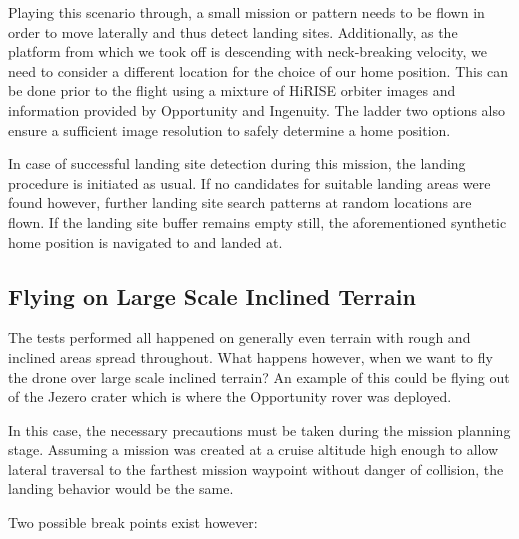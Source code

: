 Playing this scenario through, a small mission or pattern needs to be flown in order to move laterally and thus detect landing sites. Additionally, as the platform from which we took off is descending with neck-breaking velocity, we need to consider a different location for the choice of our home position. This can be done prior to the flight using a mixture of HiRISE orbiter images and information provided by Opportunity and Ingenuity. The ladder two options also ensure a sufficient image resolution to safely determine a home position.

In case of successful landing site detection during this mission, the landing procedure is initiated as usual. If no candidates for suitable landing areas were found however, further landing site search patterns at random locations are flown. If the landing site buffer remains empty still, the aforementioned synthetic home position is navigated to and landed at.

\subsection{Flying on Large Scale Inclined Terrain}
The tests performed all happened on generally even terrain with rough and inclined areas spread throughout. What happens however, when we want to fly the drone over large scale inclined terrain? An example of this could be flying out of the Jezero crater which is where the Opportunity rover was deployed.

In this case, the necessary precautions must be taken during the mission planning stage. Assuming a mission was created at a cruise altitude high enough to allow lateral traversal to the farthest mission waypoint without danger of collision, the landing behavior would be the same. 

Two possible break points exist however:


